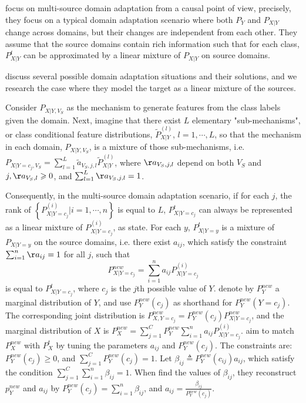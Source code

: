 \citet{mda} focus on multi-source domain adaptation from a causal point of view, precisely, they focus on a typical domain adaptation scenario where both $P_Y$ and $P_{X|Y}$ change across domains, but their changes are independent from each other. They assume that the source domains contain rich information such that for each class, $P_{X|Y}^t$ can be approximated by a linear mixture of $P_{X|Y}$ on source domains. 

\citet{mda} discuss several possible domain adaptation situations and their solutions, and we research the case where they model the target as a linear mixture of the sources. 

Consider $P_{X|Y, V_S}$ as the mechanism to generate features from the class labels given the domain. Next, imagine that there exist $L$ elementary "sub-mechanisms", or class conditional feature distributions, $\tilde{P}_{X|Y}^{(l)}$, $l = 1, \cdots, L$, so that the mechanism in each domain, $P_{X|Y, V_S}$, is a mixture of those sub-mechanisms, i.e. $P_{X|Y=c_j, V_S} = \sum_{l=1}^{L} \tilde{a}_{V_S, j, l} \tilde{P}_{X|Y}^{(l)}$, where $\aa_{V_S, j, l}$ depend on both $V_S$ and $j, {\aa}_{V_S, l} \geqslant 0$, and $\sum_{l=1}^{L} \aa_{V_S, j, l} = 1$. 

Consequently, in the multi-source domain adaptation scenario, if for each $j$, the rank of $\left \{P_{X|Y=c_j}^{(i)} | i = 1, \cdots, n \right \}$ is equal to $L$, $P_{X|Y=c_j}^{t}$ can always be represented as a linear mixture of $P_{X|Y=c_j}^{(i)}$, as \citet{mda} state. For each $y$, $P_{X|Y=y}^{t}$ is a mixture of $P_{X|Y=y}$ on the source domains, i.e. there exist $a_{ij}$, which satisfy the constraint $\sum_{i=1}^{n} \aa_{ij} = 1$ for all $j$, such that \[ P_{X|Y=c_j}^{new} = \sum_{i=1}^{n} a_{ij}P_{X|Y=c_j}^{(i)}\] is equal to $P_{X|Y=c_j}^{t}$, where $c_j$ is the $j$th possible value of $Y$. \citet{mda} denote by $P_{Y}^{new}$ a marginal distribution of $Y$, and use $P_{Y}^{new}(c_j)$ as shorthand for $P_{Y}^{new}(Y=c_j)$. The corresponding joint distribution is $P_{X,Y=c_j}^{new}=P_{Y}^{new}(c_j)P_{X|Y=c_j}^{new}$, and the marginal distribution of $X$ is $P_{X}^{new}=\sum_{j=1}^{C}P_{Y}^{new}\sum_{i=1}^{n}a_{ij}P_{X|Y=c_j}^{(i)}$. \citet{mda} aim to match $P_{X}^{new}$ with $P_{X}^{t}$ by tuning the parameters $a_{ij}$ and $P_{Y}^{new}(c_j)$. The constraints are: $P_{Y}^{new}(c_j) \geqslant 0$, and $\sum_{j=1}^{C}P_{Y}^{new}(c_j)=1$. Let $\beta_{ij} \triangleq P_{Y}^{new}(c_{ij})a_{ij}$, which satisfy the condition $\sum_{j=1}^{C}\sum_{i=1}^{n}\beta_{ij} = 1$. When \citet{mda} find the values of $\beta_{ij}$, they reconstruct $p_{Y}^{new}$ and $a_{ij}$ by $P_{Y}^{new}(c_j) = \sum_{i=1}^{n}\beta_{ij}$, and $a_{ij} = \frac{\beta_{ij}}{P_{Y}^{new}(c_j)}$.

